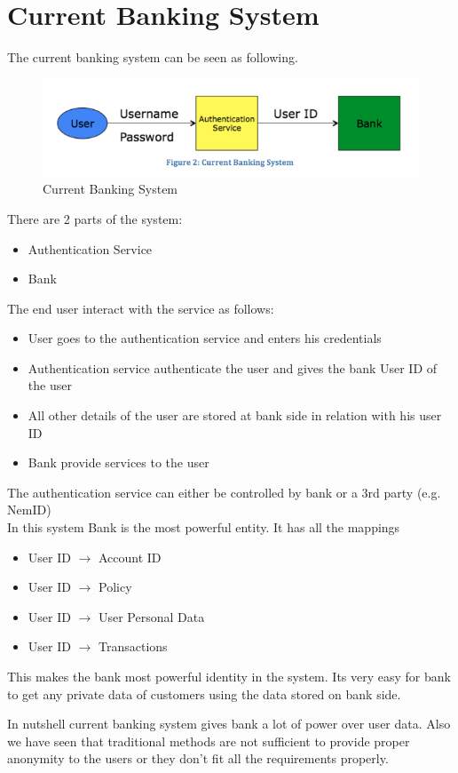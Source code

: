 \section{Current Banking System}
The current banking system can be seen as following.
\begin{figure}[h]
	\centering
	\includegraphics[width=\textwidth]{figures/Current}
	\caption{Current Banking System}
	\label{fig:Current}
\end{figure}
There are 2 parts of the system:
\begin{itemize}
	\item Authentication Service 
	\item Bank
\end{itemize}
The end user interact with the service as follows:
\begin{itemize}
\item User goes to the authentication service and enters his credentials
\item Authentication service authenticate the user and gives the bank User ID of the user
\item All other details of the user are stored at bank side in relation with his user ID
\item Bank provide services to the user 
\end{itemize}
The authentication service can either be controlled by bank or a 3rd party (e.g. NemID)
\\In this system Bank is the most powerful entity. It has all the mappings
\begin{itemize}
	\item User ID $\rightarrow$ Account ID
	\item User ID $\rightarrow$ Policy
	\item User ID $\rightarrow$ User Personal Data
	\item User ID $\rightarrow$ Transactions
\end{itemize}
This makes the bank most powerful identity in the system. Its very easy for bank to get any private data of customers using the data stored on bank side.

In nutshell current banking system gives bank a lot of power over user data. Also we have seen that traditional methods are not sufficient to provide proper anonymity to the users or they don't fit all the requirements properly.